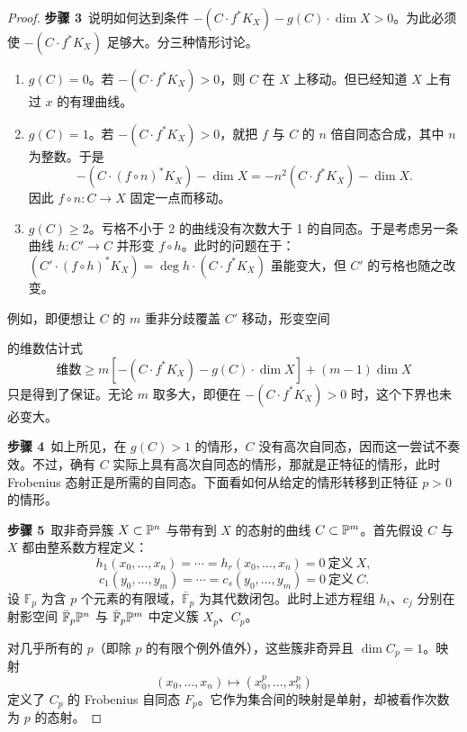 \begin{proof}

\textbf{步骤 3}\ 说明如何达到条件 $-(C\cdot f^*K_X)-g(C)\cdot\dim X>0$。为此必须使 $-(C\cdot f^*K_X)$ 足够大。分三种情形讨论。
\begin{enumerate}[label=(\arabic*),leftmargin=2.4em,itemsep=1pt,topsep=2pt]
\item $g(C)=0$。若 $-(C\cdot f^*K_X)>0$，则 $C$ 在 $X$ 上移动。但已经知道 $X$ 上有过 $x$ 的有理曲线。
\item $g(C)=1$。若 $-(C\cdot f^*K_X)>0$，就把 $f$ 与 $C$ 的 $n$ 倍自同态合成，其中 $n$ 为整数。于是
\[ -(C\cdot(f\circ n)^*K_X)-\dim X=-n^2(C\cdot f^*K_X)-\dim X. \]
因此 $f\circ n: C\to X$ 固定一点而移动。
\item $g(C)\ge 2$。亏格不小于 2 的曲线没有次数大于 1 的自同态。于是考虑另一条曲线 $h: C'\to C$ 并形变 $f\circ h$。此时的问题在于：$(C'\cdot(f\circ h)^*K_X)=\deg h\cdot(C\cdot f^*K_X)$ 虽能变大，但 $C'$ 的亏格也随之改变。
\end{enumerate}
例如，即便想让 $C$ 的 $m$ 重非分歧覆盖 $C'$ 移动，形变空间

的维数估计式
\[ \text{维数}\ge m[-(C\cdot f^*K_X)-g(C)\cdot\dim X]+(m-1)\dim X \]
只是得到了保证。无论 $m$ 取多大，即便在 $-(C\cdot f^*K_X)>0$ 时，这个下界也未必变大。

\textbf{步骤 4}\ 如上所见，在 $g(C)>1$ 的情形，$C$ 没有高次自同态，因而这一尝试不奏效。不过，确有 $C$ 实际上具有高次自同态的情形，那就是正特征的情形，此时 Frobenius 态射正是所需的自同态。下面看如何从给定的情形转移到正特征 $p>0$ 的情形。

\textbf{步骤 5}\ 取非奇异簇 $X\subset\mathbb{P}^n$ 与带有到 $X$ 的态射的曲线 $C\subset\mathbb{P}^m$。首先假设 $C$ 与 $X$ 都由整系数方程定义：
\[ h_1(x_0,\dots,x_n)=\cdots=h_r(x_0,\dots,x_n)=0\ \text{定义}\ X, \]
\[ c_1(y_0,\dots,y_m)=\cdots=c_s(y_0,\dots,y_m)=0\ \text{定义}\ C. \]
设 $\mathbb{F}_p$ 为含 $p$ 个元素的有限域，$\bar{\mathbb{F}}_p$ 为其代数闭包。此时上述方程组 $h_i$、$c_j$ 分别在射影空间 $\bar{\mathbb{F}}_p\mathbb{P}^n$ 与 $\bar{\mathbb{F}}_p\mathbb{P}^m$ 中定义簇 $X_p$、$C_p$。

对几乎所有的 $p$（即除 $p$ 的有限个例外值外），这些簇非奇异且 $\dim C_p=1$。映射
\[ (x_0,\dots,x_n)\mapsto(x_0^p,\dots,x_n^p) \]
定义了 $C_p$ 的 Frobenius 自同态 $F_p$。它作为集合间的映射是单射，却被看作次数为 $p$ 的态射。



\end{proof}
